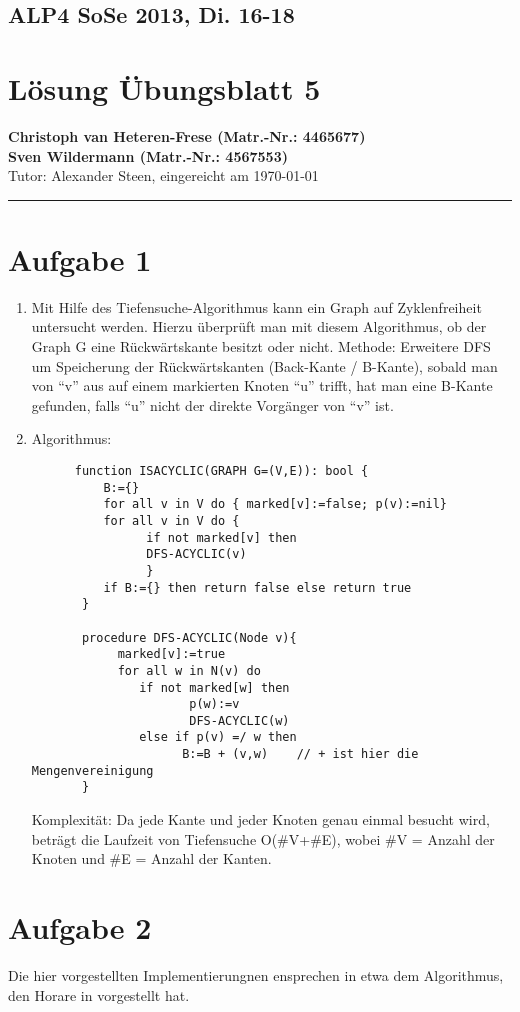 \documentclass[11pt,a4paper,DIV=10,]{scrartcl}
\begin{document}
\subsection*{ALP4 SoSe 2013, Di. 16-18}
\section*{Lösung Übungsblatt 5}
\textbf{Christoph van Heteren-Frese (Matr.-Nr.: 4465677)} \\ \textbf{Sven Wildermann (Matr.-Nr.: 4567553)}\\
Tutor: Alexander Steen, eingereicht am \today\\
\hrule

\section*{Aufgabe 1}
\begin{enumerate}
 \item Mit Hilfe des Tiefensuche-Algorithmus kann ein Graph auf Zyklenfreiheit untersucht werden. Hierzu überprüft man mit diesem Algorithmus, ob der
 Graph G eine Rückwärtskante besitzt oder nicht. Methode: Erweitere DFS um Speicherung der Rückwärtskanten (Back-Kante / B-Kante), sobald man von ``v''
 aus auf einem markierten Knoten ``u'' trifft, hat man eine B-Kante gefunden, falls ``u'' nicht der direkte Vorgänger von ``v'' ist. 
 \item Algorithmus: 
 \begin{lstlisting}
      function ISACYCLIC(GRAPH G=(V,E)): bool {
          B:={}
          for all v in V do { marked[v]:=false; p(v):=nil}
          for all v in V do {
	      		if not marked[v] then
	      		DFS-ACYCLIC(v)
	     	 	}
          if B:={} then return false else return true
       }
       
       procedure DFS-ACYCLIC(Node v){
            marked[v]:=true
            for all w in N(v) do
               if not marked[w] then
                      p(w):=v
                      DFS-ACYCLIC(w)
               else if p(v) =/ w then
                     B:=B + (v,w)    // + ist hier die Mengenvereinigung
       }
 \end{lstlisting}
  Komplexität: Da jede Kante und jeder Knoten genau einmal besucht wird, beträgt die Laufzeit von Tiefensuche O(\#V+\#E), wobei \#V = Anzahl der Knoten und \#E = Anzahl der Kanten.  
\end{enumerate}
\section*{Aufgabe 2}
Die hier vorgestellten Implementierungnen ensprechen in etwa dem Algorithmus, den Horare in \cite{Hoare1974} vorgestellt hat.
\end{document}
